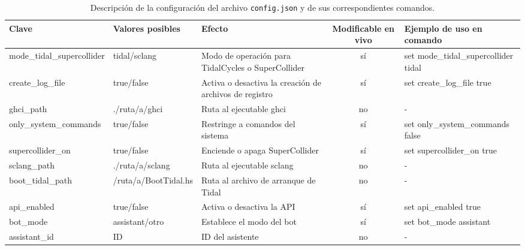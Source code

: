 \begin{landscape}
    \begin{table}[htbp]
        \centering
        \caption{Descripción de la configuración del archivo \texttt{config.json} y de sus correspondientes comandos.}
        \label{tab:config-description}
        \fontsize{9.5pt}{11pt}\selectfont
        \begingroup
        \begin{tabularx}{\linewidth}{lXlcl}
            \toprule
            \rowcolor{azul_unir} %
            \textbf{Clave} & \textbf{Valores posibles} & \textbf{Efecto} & \textbf{Modificable en vivo} & \textbf{Ejemplo de uso en comando} \\
            \midrule
        mode\_tidal\_supercollider & tidal/sclang & Modo de operación para TidalCycles o SuperCollider & sí & set mode\_tidal\_supercollider tidal \\
        create\_log\_file & \textcolor{truecolor}{true}/\textcolor{falsecolor}{false} & Activa o desactiva la creación de archivos de registro & sí & set create\_log\_file \textcolor{truecolor}{true} \\
        ghci\_path & \textcolor{pathcolor}{./ruta/a/ghci} & Ruta al ejecutable ghci & no & - \\
        only\_system\_commands & \textcolor{truecolor}{true}/\textcolor{falsecolor}{false} & Restringe a comandos del sistema & sí & set only\_system\_commands \textcolor{falsecolor}{false} \\
        supercollider\_on & \textcolor{truecolor}{true}/\textcolor{falsecolor}{false} & Enciende o apaga SuperCollider & sí & set supercollider\_on \textcolor{truecolor}{true} \\
        sclang\_path & \textcolor{pathcolor}{./ruta/a/sclang} & Ruta al ejecutable sclang & no & - \\
        boot\_tidal\_path & \textcolor{pathcolor}{/ruta/a/BootTidal.hs} & Ruta al archivo de arranque de Tidal & no & - \\
        api\_enabled & \textcolor{truecolor}{true}/\textcolor{falsecolor}{false} & Activa o desactiva la API & sí & set api\_enabled \textcolor{truecolor}{true} \\
        bot\_mode & assistant/otro & Establece el modo del bot & sí & set bot\_mode assistant \\
        assistant\_id & ID & ID del asistente & no & - \\

\end{tabularx}
\end{table}
\end{landscape}
